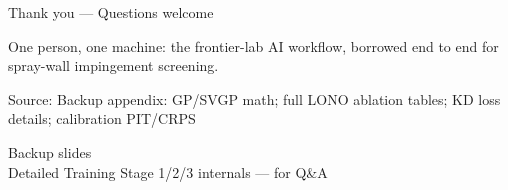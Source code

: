 \documentclass[aspectratio=169,11pt]{beamer}
\newcommand{\blue}[1]{\textcolor{aaltoBlue}{#1}}
\newcommand{\src}[1]{\vfill{\tiny\textcolor{gray!70!black}{Source: #1}}}
\begin{document}
\begin{frame}[c]{}
\centering
{\Huge \blue{Thank you --- Questions welcome}}
\bigskip\bigskip

\large One person, one machine: the frontier-lab AI workflow, borrowed end to end
for spray-wall impingement screening.

\bigskip\bigskip
\src{Backup appendix: GP/SVGP math; full LONO ablation tables; KD loss details; calibration PIT/CRPS}
\end{frame}


\appendix

\begin{frame}[c]{}
  \begin{center}
    {\Huge \blue{Backup slides}}\\[1.2em]
    {\large Detailed Training Stage 1/2/3 internals --- for Q\&A}
  \end{center}
\end{frame}
\end{document}
